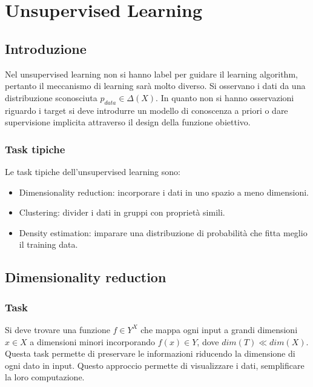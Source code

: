 \chapter{Unsupervised Learning}

\section{Introduzione}
Nel unsupervised learning non si hanno label per guidare il learning algorithm, pertanto il meccanismo di learning sar\`a molto diverso.
Si osservano i dati da una distribuzione sconosciuta $p_{data}\in\Delta(X)$.
In quanto non si hanno osservazioni riguardo i target si deve introdurre un modello di conoscenza a priori o dare supervisione implicita attraverso il design della funzione obiettivo.

	\subsection{Task tipiche}
	Le task tipiche dell'unsupervised learning sono:
	\begin{itemize}
		\item Dimensionality reduction: incorporare i dati in uno spazio a meno dimensioni.
		\item Clustering: divider i dati in gruppi con propriet\`a simili.
		\item Density estimation: imparare una distribuzione di probabilit\`a che fitta meglio il training data.
	\end{itemize}

\section{Dimensionality reduction}

	\subsection{Task}
	Si deve trovare una funzione $f\in Y^X$ che mappa ogni input a grandi dimensioni $x\in X$ a dimensioni minori incorporando $f(x)\in Y$, dove $dim(T)\ll dim(X)$.
	Questa task permette di preservare le informazioni riducendo la dimensione di ogni dato in input.
	Questo approccio permette di visualizzare i dati, semplificare la loro computazione.

